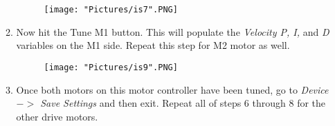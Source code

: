 \documentclass[12pt]{article}
\begin{document}
\begin{enumerate}
\begin{enumerate}
		\begin{figure}[H]
	 		\centering
			\texttt{[image: "Pictures/is7".PNG]}
	 		\caption{}
		\end{figure}

		\item Now hit the Tune M1 button. This will populate the \textit{Velocity P, I,} and \textit{D} variables on the M1 side. Repeat this step for M2 motor as well.

		\begin{figure}[H]
	 		\centering
			\texttt{[image: "Pictures/is9".PNG]}
	 		\caption{}
		\end{figure}
	
		\item Once both motors on this motor controller have been tuned, go to \textit{Device $->$ Save Settings} and then exit. Repeat all of steps 6 through 8 for the other drive motors.
	\end{enumerate}


\end{enumerate}
\end{document}
